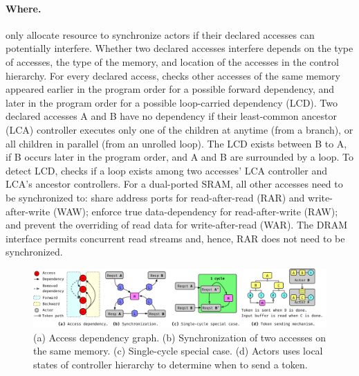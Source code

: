 \paragraph{Where.}
\name only allocate resource to synchronize actors if their declared accesses can potentially interfere.
Whether two declared accesses interfere depends on the type of accesses, the type of the memory, and location of the accesses in the control hierarchy.
For every declared access, \name{} checks other accesses of the same memory appeared earlier in the program order for a possible forward dependency, and later in the program order for a possible loop-carried dependency (LCD). 
Two declared accesses A and B have no dependency if their least-common ancestor (LCA) controller executes only one of the children at anytime (from a branch), or all children in parallel (from an unrolled loop).
The LCD exists between B to A, if B occurs later in the program order, and A and B are surrounded by a loop.
To detect LCD, \name checks if a loop exists among two accesses' LCA controller and LCA's ancestor controllers.
For a dual-ported SRAM, all other accesses need to be synchronized to: share address ports for read-after-read (RAR) and write-after-write (WAW); 
enforce true data-dependency for read-after-write (RAW); and
prevent the overriding of read data for write-after-read (WAR).
The DRAM interface permits concurrent read streams and, hence, RAR does not need to be synchronized.

\begin{figure}
\centering
\includegraphics[width=1.0\textwidth]{figs/synch_mech.pdf}
\caption{
    (a) Access dependency graph.
    (b) Synchronization of two accesses on the same memory.
    (c) Single-cycle special case.
    (d) Actors uses local states of controller hierarchy to determine when to send a token.
}\label{fig:depgraph}\label{fig:token}\label{fig:tokentrick}\label{fig:tokenwhen}
\end{figure}

